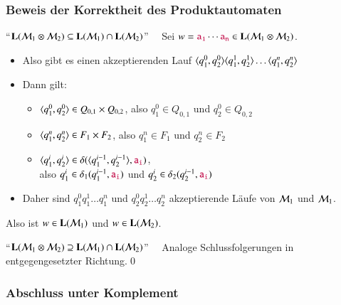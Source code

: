 \documentclass[onlymath]{beamer}
\begin{document}
\begin{frame}\frametitle{Beweis der Korrektheit des Produktautomaten}

"`$\textbf{\textcolor{black}{L}}(\mathcal{M}_1\otimes\mathcal{M}_2) \subseteq \textbf{\textcolor{black}{L}}(\mathcal{M}_1)\cap\textbf{\textcolor{black}{L}}(\mathcal{M}_2)$"'~~ Sei $w=\mathtt{\textcolor{purple}{a_1}}\cdots\mathtt{\textcolor{purple}{a_n}}\in\textbf{\textcolor{black}{L}}(\mathcal{M}_1\otimes\mathcal{M}_2)$.\pause
\begin{itemize}
\item Also gibt es einen akzeptierenden Lauf $\langle{q_1^0,q_2^0}\rangle\langle{q_1^1,q_2^1}\rangle\ldots\langle{q_1^n,q_2^n}\rangle$\pause
\item Dann gilt:
\begin{itemize}
\item $\langle{q_1^0,q_2^0}\rangle\in Q_{0,1}\times Q_{0,2}$, also $q_1^0\in Q_{0,1}$ und $q_2^0\in Q_{0,2}$
\item $\langle{q_1^n,q_2^n}\rangle\in F_1\times F_2$, also $q_1^n\in F_1$ und $q_2^n\in F_2$
\item $\langle{q_1^i,q_2^i}\rangle\in \delta(\langle{q_1^{i-1},q_2^{i-1}}\rangle,\mathtt{\textcolor{purple}{a_i}})$,\\ also
$q_1^i\in \delta_1(q_1^{i-1},\mathtt{\textcolor{purple}{a_i}})$ und $q_2^i\in \delta_2(q_2^{i-1},\mathtt{\textcolor{purple}{a_i}})$\pause
\end{itemize}
\item Daher sind $q_1^0 q_1^1 \ldots q_1^n$ und $q_2^0 q_2^1 \ldots q_2^n$ akzeptierende Läufe von $\mathcal{M}_1$ und $\mathcal{M}_1$.\pause
\end{itemize}
Also ist $w\in\textbf{\textcolor{black}{L}}(\mathcal{M}_1)$ und $w\in\textbf{\textcolor{black}{L}}(\mathcal{M}_2)$.\pause
\bigskip

"`$\textbf{\textcolor{black}{L}}(\mathcal{M}_1\otimes\mathcal{M}_2) \supseteq \textbf{\textcolor{black}{L}}(\mathcal{M}_1)\cap\textbf{\textcolor{black}{L}}(\mathcal{M}_2)$"'~~
Analoge Schlussfolgerungen in entgegengesetzter Richtung.\qed

\end{frame}

\begin{frame}\frametitle{Abschluss unter Komplement}


\end{frame}
\end{document}
